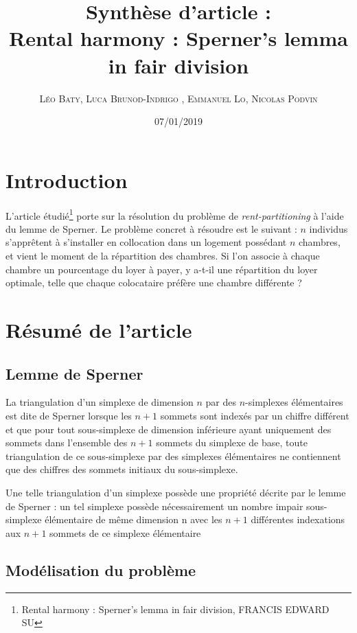 \documentclass[12pt,twoside,a4paper]{article}
\title{\textbf{Synth\`ese d'article} :\\ Rental harmony : Sperner's lemma in fair division}
\author{\textsc{L\'eo Baty, Luca Brunod-Indrigo , Emmanuel Lo, Nicolas Podvin}}
\date{07/01/2019}
\begin{document}
\maketitle


\tableofcontents

\section{Introduction}

L'article \'etudi\'e\footnote{Rental harmony : Sperner's lemma in fair division, FRANCIS EDWARD SU} porte sur la r\'esolution du probl\`eme de \textit{rent-partitioning} \`a l'aide du lemme de Sperner. Le probl\`eme concret \`a r\'esoudre est le suivant : $n$ individus s'appr\^{e}tent \`a s'installer en collocation dans un logement poss\'edant $n$ chambres, et vient le moment de la r\'epartition des chambres. Si l'on associe \`a chaque chambre un pourcentage du loyer \`a payer, y a-t-il une r\'epartition du loyer optimale, telle que chaque colocataire pr\'ef\`ere une chambre diff\'erente ? 

\section{R\'esum\'e de l'article}

\subsection{Lemme de Sperner}

La triangulation d'un simplexe de dimension $n$ par des $n$-simplexes \'el\'ementaires est dite de Sperner lorsque les $n+1$ sommets sont index\'es par un chiffre diff\'erent et que pour tout sous-simplexe de dimension inférieure ayant uniquement des sommets dans l'ensemble des $n+1$ sommets du simplexe de base, toute triangulation de ce sous-simplexe par des simplexes \'el\'ementaires ne contiennent que des chiffres des sommets initiaux du sous-simplexe.

Une telle triangulation d'un simplexe poss\`ede une propriété d\'ecrite par le lemme de Sperner : un tel simplexe possède n\'ecessairement un nombre impair sous-simplexe élémentaire de même dimension n avec les $n+1$ différentes indexations aux $n+1$ sommets de ce simplexe \'el\'ementaire

\subsection{Mod\'elisation du probl\`eme}
\end{document}
